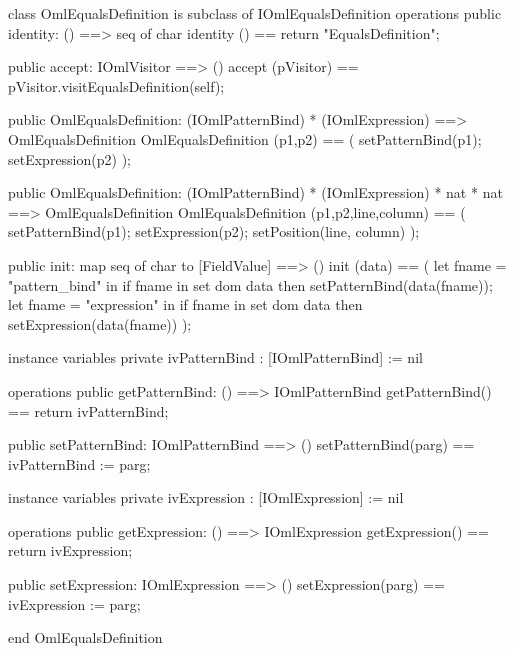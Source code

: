 \begin{vdm_al}
class OmlEqualsDefinition is subclass of IOmlEqualsDefinition
operations
  public identity: () ==> seq of char
  identity () == return "EqualsDefinition";

  public accept: IOmlVisitor ==> ()
  accept (pVisitor) == pVisitor.visitEqualsDefinition(self);

  public OmlEqualsDefinition:
    (IOmlPatternBind) *
    (IOmlExpression) ==> OmlEqualsDefinition
  OmlEqualsDefinition (p1,p2) == 
    ( setPatternBind(p1);
      setExpression(p2) );

  public OmlEqualsDefinition:
    (IOmlPatternBind) *
    (IOmlExpression) *
    nat *
    nat ==> OmlEqualsDefinition
  OmlEqualsDefinition (p1,p2,line,column) == 
    ( setPatternBind(p1);
      setExpression(p2);
      setPosition(line, column) );

  public init: map seq of char to [FieldValue] ==> ()
  init (data) ==
    ( let fname = "pattern_bind" in
        if fname in set dom data
        then setPatternBind(data(fname));
      let fname = "expression" in
        if fname in set dom data
        then setExpression(data(fname)) );

instance variables
  private ivPatternBind : [IOmlPatternBind] := nil

operations
  public getPatternBind: () ==> IOmlPatternBind
  getPatternBind() == return ivPatternBind;

  public setPatternBind: IOmlPatternBind ==> ()
  setPatternBind(parg) == ivPatternBind := parg;

instance variables
  private ivExpression : [IOmlExpression] := nil

operations
  public getExpression: () ==> IOmlExpression
  getExpression() == return ivExpression;

  public setExpression: IOmlExpression ==> ()
  setExpression(parg) == ivExpression := parg;

end OmlEqualsDefinition
\end{vdm_al}

